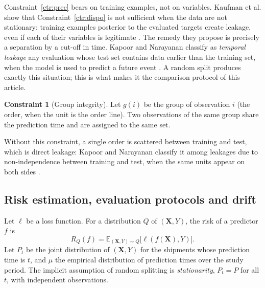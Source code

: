 \documentclass[11pt,a4paper]{article}
\newcommand{\E}{\mathbb{E}}
\theoremstyle{definition}
\newtheorem{contrainte}{Constraint}
\begin{document}
Constraint~\ref{ctr:prec} bears on training examples, not on variables. Kaufman et al. show that Constraint~\ref{ctr:dispo} is not sufficient when the data are not stationary: training examples posterior to the evaluated targets create leakage, even if each of their variables is legitimate \cite{kaufman2012leakage}. The remedy they propose is precisely a separation by a cut-off in time. Kapoor and Narayanan classify as \emph{temporal leakage} any evaluation whose test set contains data earlier than the training set, when the model is used to predict a future event \cite{kapoor2023leakage}. A random split produces exactly this situation; this is what makes it the comparison protocol of this article.

\begin{contrainte}[Group integrity]
\label{ctr:groupes}
Let $g(i)$ be the group of observation $i$ (the order, when the unit is the order line). Two observations of the same group share the prediction time and are assigned to the same set.
\end{contrainte}
Without this constraint, a single order is scattered between training and test, which is direct leakage: Kapoor and Narayanan classify it among leakages due to non-independence between training and test, when the same units appear on both sides \cite{kapoor2023leakage}.

\subsection{Risk estimation, evaluation protocols and drift}
\label{sec:protocoles}

Let $\ell$ be a loss function. For a distribution $Q$ of $(\mathbf{X}, Y)$, the risk of a predictor $f$ is
\begin{equation}
  R_Q(f) = \E_{(\mathbf{X},Y)\sim Q}\bigl[\ell(f(\mathbf{X}), Y)\bigr].
  \label{eq:risque}
\end{equation}
Let $P_t$ be the joint distribution of $(\mathbf{X},Y)$ for the shipments whose prediction time is $t$, and $\mu$ the empirical distribution of prediction times over the study period. The implicit assumption of random splitting is \emph{stationarity}, $P_t = P$ for all $t$, with independent observations.
\end{document}
